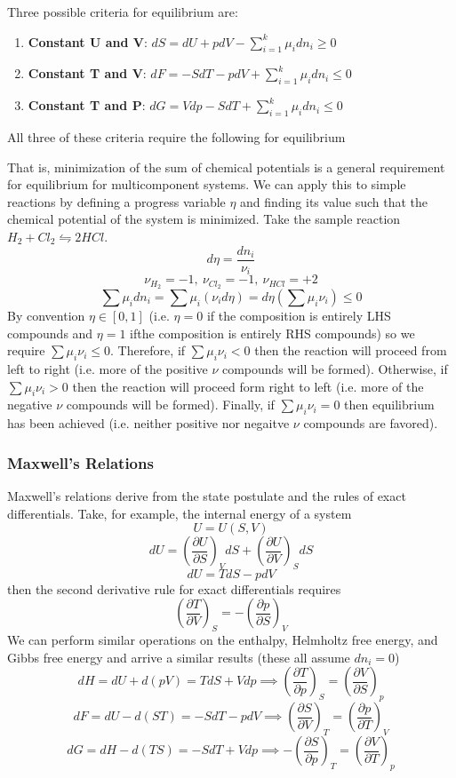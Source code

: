 \documentclass[11pt]{article}
\newcommand{\Item}[1]{\item \textbf{#1}:}
\newcommand{\CenteredBoxed}[1]{\begin{center}\boxed{#1}\end{center}}
\newcommand{\sumlim}[2]{\sum\limits_{#1}^{#2}}
\newcommand{\Partial}[2]{\frac{\partial #1}{\partial #2}}
\newcommand{\PartialConst}[3]{\left(\Partial{#1}{#2}\right)_{#3}}
\begin{document}
Three possible criteria for equilibrium are:
\begin{enumerate}
\Item{Constant U and V} $dS = dU + pdV - \sumlim{i=1}{k}\mu_idn_i \geq 0$
\Item{Constant T and V} $dF = -SdT - pdV + \sumlim{i=1}{k}\mu_idn_i \leq 0$
\Item{Constant T and P} $dG = Vdp - SdT + \sumlim{i=1}{k}\mu_idn_i \leq 0$
\end{enumerate}
All three of these criteria require the following for equilibrium
\CenteredBoxed{\sumlim{i=1}{k}\mu_idn_i \leq 0}
That is, minimization of the sum of chemical potentials is a general requirement for equilibrium for multicomponent systems. We can apply this to simple reactions by defining a progress variable $\eta$ and finding its value such that the chemical potential of the system is minimized. Take the sample reaction $H_2 + Cl_2 \leftrightharpoons 2HCl$.
$$d\eta = \frac{dn_i}{\nu_i}$$
$$\nu_{H_2} = -1,\ \nu_{Cl_2} = -1,\ \nu_{HCl} = +2$$ 
$$\sum\mu_idn_i=\sum\mu_i(\nu_id\eta)=d\eta\left(\sum\mu_i\nu_i\right)\leq0$$
By convention $\eta\in[0,1]$ (i.e. $\eta=0$ if the composition is entirely LHS compounds and $\eta=1$ ifthe composition is entirely RHS compounds) so we require $\sum\mu_i\nu_i\leq0$. Therefore, if $\sum\mu_i\nu_i<0$ then the reaction will proceed from left to right (i.e. more of the positive $\nu$ compounds will be formed). Otherwise, if $\sum\mu_i\nu_i>0$ then the reaction will proceed form right to left (i.e. more of the negative $\nu$ compounds will be formed). Finally, if $\sum\mu_i\nu_i=0$ then equilibrium has been achieved (i.e. neither positive nor negaitve $\nu$ compounds are favored).

\subsubsection{Maxwell's Relations}
Maxwell's relations derive from the state postulate and the rules of exact differentials. Take, for example, the internal energy of a system
$$U = U(S,V)$$
$$dU = \PartialConst{U}{S}{V}dS + \PartialConst{U}{V}{S}dS$$
$$dU = TdS - pdV$$
then the second derivative rule for exact differentials requires
$$\PartialConst{T}{V}{S} = -\PartialConst{p}{S}{V}$$
We can perform similar operations on the enthalpy, Helmholtz free energy, and Gibbs free energy and arrive a similar results (these all assume $dn_i=0$)
$$dH = dU + d(pV) = TdS + Vdp \implies \PartialConst{T}{p}{S} = \PartialConst{V}{S}{p}$$
$$dF = dU - d(ST) = -SdT - pdV \implies \PartialConst{S}{V}{T} = \PartialConst{p}{T}{V}$$
$$dG = dH - d(TS) = -SdT + Vdp \implies -\PartialConst{S}{p}{T} = \PartialConst{V}{T}{p}$$
\end{document}
